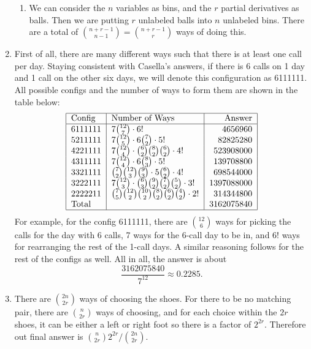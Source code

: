 \documentclass{article}
\begin{document}
\begin{enumerate}
\begin{enumerate}
        \item We can consider the $n$ variables as bins, and the $r$ partial derivatives as
        balls. Then we are putting $r$ unlabeled balls into $n$ unlabeled bins. There are a
        total of $\binom{n + r - 1}{n - 1} = \binom{n + r - 1}{r}$ ways of doing this.
    \end{enumerate}

    \item First of all, there are many different ways such that there is at least one call per day. Staying consistent
    with Casella's answers, if there is 6 calls on 1 day and 1 call on the other six days, we will denote this
    configuration as 6111111. All possible configs and the number of ways to form them are shown in the table below:
    \[ \begin{tabular}{|l|l|r|}
        \hline
        \text{Config} & \text{Number of Ways} & \text{Answer} \\
        \hline
        6111111 & $7\binom{12}{7} \cdot 6!$ & 4656960 \\
        5211111 & $7\binom{12}{5} \cdot 6\binom{7}{2} \cdot 5! $ & 82825280 \\
        4221111 & $7\binom{12}{4} \cdot \binom{6}{2}\binom{8}{2}\binom{6}{2} \cdot 4!$
        & 523908000 \\
        4311111 & $7\binom{12}{4} \cdot 6\binom{8}{3} \cdot 5! $ & 139708800 \\
        3321111 & $\binom{7}{2}\binom{12}{3}\binom{9}{3} \cdot 5\binom{6}{2} \cdot 4!$
        & 698544000 \\
        3222111 & $7\binom{12}{3} \cdot \binom{6}{3}\binom{9}{2}\binom{7}{2}\binom{5}{2} \cdot 3!$
        & 1397088000 \\
        2222211 & $\binom{7}{5}\binom{12}{2}\binom{10}{2}\binom{8}{2}\binom{6}{2}\binom{4}{2}
        \cdot 2!$ & 314344800 \\
        Total & & 3162075840 \\
        \hline
    \end{tabular} \]
    For example, for the config 6111111, there are $\binom{12}{6}$ ways for picking the calls
    for the day with 6 calls, 7 ways for the 6-call day to be in, and $6!$ ways for rearranging
    the rest of the 1-call days. A similar reasoning follows for the rest of the configs as well.
    All in all, the answer is about
    \[ \frac{3162075840}{7^{12}} \approx 0.2285. \]

    \item There are $\binom{2n}{2r}$ ways of choosing the shoes. For there to be no matching pair,
    there are $\binom{n}{2r}$ ways of choosing, and for each choice within the $2r$ shoes, it can
    be either a left or right foot so there is a factor of $2^{2r}$. Therefore out final answer is
    $\binom{n}{2r}2^{2r} / \binom{2n}{2r}$.


\end{enumerate}
\end{document}
